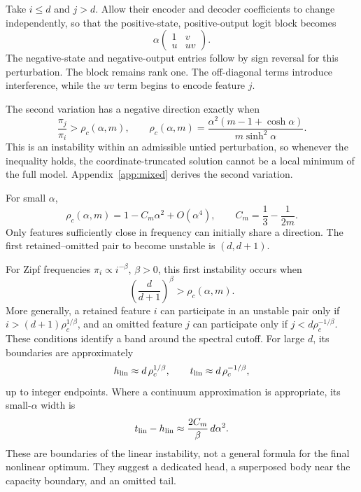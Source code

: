 Take $i\le d$ and $j>d$. Allow their encoder and decoder
coefficients to change independently, so that the positive-state,
positive-output logit block becomes
\begin{equation}
\alpha
\begin{pmatrix}
1 & v\\
u & uv
\end{pmatrix}.
\label{eq:mixing-perturbation}
\end{equation}
The negative-state and negative-output entries follow by sign
reversal for this perturbation. The block remains rank one.
The off-diagonal terms introduce interference, while the
$uv$ term begins to encode feature $j$.

The second variation has a negative direction exactly when
\begin{equation}
\boxed{
\frac{\pi_j}{\pi_i}>\rho_c(\alpha,m),
\qquad
\rho_c(\alpha,m)=
\frac{\alpha^2(m-1+\cosh\alpha)}
{m\sinh^2\alpha}.
}
\label{eq:frequency-threshold}
\end{equation}
This is an instability within an admissible untied perturbation,
so whenever the inequality holds, the coordinate-truncated
solution cannot be a local minimum of the full model.
Appendix~\ref{app:mixed} derives the second variation.

For small $\alpha$,
\begin{equation}
\rho_c(\alpha,m)
=
1-C_m\alpha^2+O(\alpha^4),
\qquad
C_m=\frac13-\frac1{2m}.
\label{eq:threshold-expansion}
\end{equation}
Only features sufficiently close in frequency can initially
share a direction. The first retained--omitted pair to become
unstable is $(d,d+1)$.

For Zipf frequencies $\pi_i\propto i^{-\beta}$, $\beta>0$, this
first instability occurs when
\begin{equation}
\left(\frac{d}{d+1}\right)^\beta
>
\rho_c(\alpha,m).
\label{eq:zipf-onset}
\end{equation}
More generally, a retained feature $i$ can participate in an
unstable pair only if
$i>(d+1)\rho_c^{1/\beta}$, and an omitted feature $j$ can
participate only if $j<d\rho_c^{-1/\beta}$. These conditions
identify a band around the spectral cutoff. For large $d$,
its boundaries are approximately
\begin{equation}
h_{\rm lin}\approx d\,\rho_c^{1/\beta},
\qquad
t_{\rm lin}\approx d\,\rho_c^{-1/\beta},
\label{eq:zipf-band}
\end{equation}
up to integer endpoints. Where a continuum approximation is
appropriate, its small-$\alpha$ width is
\[
t_{\rm lin}-h_{\rm lin}
\approx
\frac{2C_m}{\beta}\,d\alpha^2.
\]
These are boundaries of the linear instability, not a general
formula for the final nonlinear optimum. They suggest a
dedicated head, a superposed body near the capacity boundary,
and an omitted tail.

